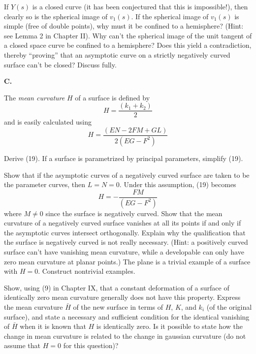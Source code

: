 \documentclass{book}
\begin{document}
If $Y(s)$ is a closed curve (it has been conjectured that this is impossible!), then clearly so is the spherical image of $v_{1}(s)$. If the spherical image of $v_{1}(s)$ is simple (free of double points), why must it be confined to a hemisphere? (Hint: see Lemma 2 in Chapter II). Why can't the spherical image of the unit tangent of a closed space curve be confined to a hemisphere? Does this yield a contradiction, thereby ``proving'' that an asymptotic curve on a strictly negatively curved surface can't be closed? Discuss fully.

\vspace{0.3cm}

\noindent \textbf{C.} 

\vspace{0.3cm}

The \emph{mean curvature} $H$ of a surface is defined by
\begin{equation}
H = \frac{(k_{1} + k_{2})}{2}
\end{equation}
and is easily calculated using
\begin{equation}
H = \frac{(EN - 2FM + GL)}{2(EG - F^{2})}
\end{equation}

Derive (19). If a surface is parametrized by principal parameters, simplify (19).

Show that if the asymptotic curves of a negatively curved surface are taken to be the parameter curves, then $L = N = 0$. Under this assumption, (19) becomes
\begin{equation}
H = - \frac{FM}{(EG - F^{2})}
\end{equation}
where $M \neq 0$ since the surface is negatively curved. Show that the mean curvature of a negatively curved surface vanishes at all its points if and only if the asymptotic curves intersect orthogonally. Explain why the qualification that the surface is negatively curved is not really necessary. (Hint: a positively curved surface can't have vanishing mean curvature, while a developable can only have zero mean curvature at planar points.) The plane is a trivial example of a surface with $H = 0$. Construct nontrivial examples.

Show, using (9) in Chapter IX, that a constant deformation of a surface of identically zero mean curvature generally does not have this property. Express the mean curvature $\bar{H}$ of the new surface in terms of $H$, $K$, and $k_{i}$ (of the original surface), and state a necessary and sufficient condition for the identical vanishing of $\bar{H}$ when it is known that $H$ is identically zero. Is it possible to state how the change in mean curvature is related to the change in gaussian curvature (do not assume that $H = 0$ for this question)?
\end{document}
